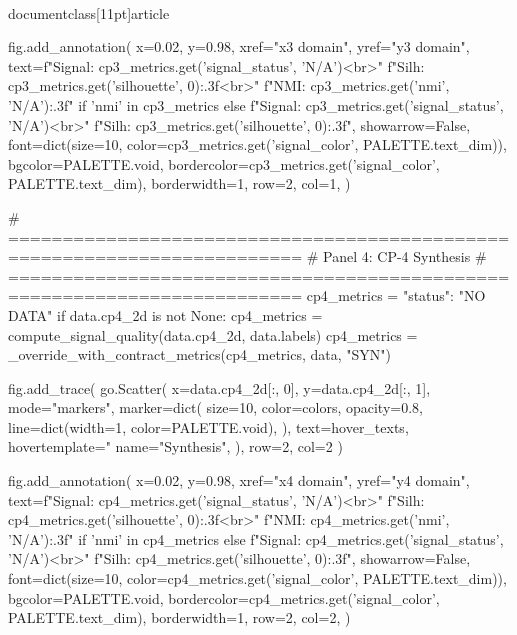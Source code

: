 \\documentclass[11pt]{article}
\begin{document}
\begin{CodeBlock}
        fig.add_annotation(
            x=0.02, y=0.98,
            xref="x3 domain", yref="y3 domain",
            text=f"Signal: {cp3_metrics.get('signal_status', 'N/A')}<br>"
                 f"Silh: {cp3_metrics.get('silhouette', 0):.3f}<br>"
                 f"NMI: {cp3_metrics.get('nmi', 'N/A'):.3f}" if 'nmi' in cp3_metrics else
                 f"Signal: {cp3_metrics.get('signal_status', 'N/A')}<br>"
                 f"Silh: {cp3_metrics.get('silhouette', 0):.3f}",
            showarrow=False,
            font=dict(size=10, color=cp3_metrics.get('signal_color', PALETTE.text_dim)),
            bgcolor=PALETTE.void,
            bordercolor=cp3_metrics.get('signal_color', PALETTE.text_dim),
            borderwidth=1,
            row=2, col=1,
        )

    # =========================================================================
    # Panel 4: CP-4 Synthesis
    # =========================================================================
    cp4_metrics = {"status": "NO DATA"}
    if data.cp4_2d is not None:
        cp4_metrics = compute_signal_quality(data.cp4_2d, data.labels)
        cp4_metrics = _override_with_contract_metrics(cp4_metrics, data, "SYN")

        fig.add_trace(
            go.Scatter(
                x=data.cp4_2d[:, 0],
                y=data.cp4_2d[:, 1],
                mode="markers",
                marker=dict(
                    size=10,
                    color=colors,
                    opacity=0.8,
                    line=dict(width=1, color=PALETTE.void),
                ),
                text=hover_texts,
                hovertemplate="%
                name="Synthesis",
            ),
            row=2, col=2
        )

        fig.add_annotation(
            x=0.02, y=0.98,
            xref="x4 domain", yref="y4 domain",
            text=f"Signal: {cp4_metrics.get('signal_status', 'N/A')}<br>"
                 f"Silh: {cp4_metrics.get('silhouette', 0):.3f}<br>"
                 f"NMI: {cp4_metrics.get('nmi', 'N/A'):.3f}" if 'nmi' in cp4_metrics else
                 f"Signal: {cp4_metrics.get('signal_status', 'N/A')}<br>"
                 f"Silh: {cp4_metrics.get('silhouette', 0):.3f}",
            showarrow=False,
            font=dict(size=10, color=cp4_metrics.get('signal_color', PALETTE.text_dim)),
            bgcolor=PALETTE.void,
            bordercolor=cp4_metrics.get('signal_color', PALETTE.text_dim),
            borderwidth=1,
            row=2, col=2,
        )


\end{CodeBlock}
\end{document}

